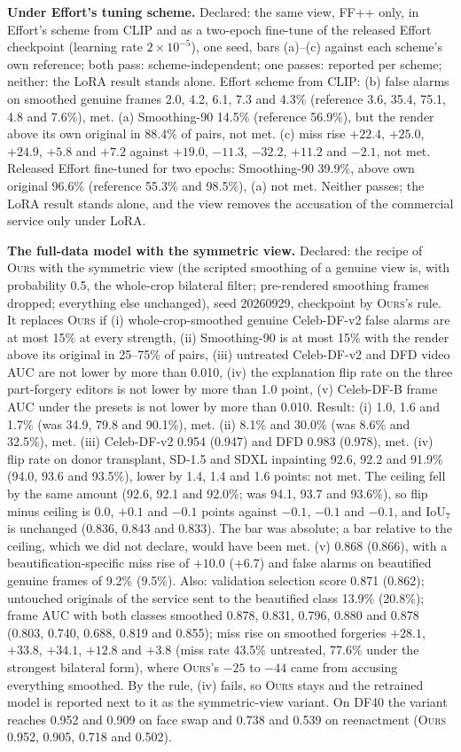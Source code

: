 \documentclass[10pt]{article}
\newcommand{\ours}{\textsc{Ours}}
\begin{document}
\textbf{Under Effort's tuning scheme.} Declared: the same view, FF++ only, in Effort's scheme from CLIP and as a two-epoch fine-tune
of the released Effort checkpoint (learning rate $2\times10^{-5}$), one seed, bars (a)--(c) against each scheme's own reference;
both pass: scheme-independent; one passes: reported per scheme; neither: the LoRA result stands alone. Effort scheme from CLIP: (b)
false alarms on smoothed genuine frames 2.0, 4.2, 6.1, 7.3 and 4.3\% (reference 3.6, 35.4, 75.1, 4.8 and 7.6\%), met. (a)
Smoothing-90 14.5\% (reference 56.9\%), but the render above its own original in 88.4\% of pairs, not met. (c) miss rise $+22.4$,
$+25.0$, $+24.9$, $+5.8$ and $+7.2$ against $+19.0$, $-11.3$, $-32.2$, $+11.2$ and $-2.1$, not met. Released Effort fine-tuned for two
epochs: Smoothing-90 39.9\%, above own original 96.6\% (reference 55.3\% and 98.5\%), (a) not met. Neither passes; the LoRA result
stands alone, and the view removes the accusation of the commercial service only under LoRA.

\textbf{The full-data model with the symmetric view.} Declared: the recipe of \ours{} with the symmetric view (the scripted smoothing
of a genuine view is, with probability 0.5, the whole-crop bilateral filter; pre-rendered smoothing frames dropped; everything else
unchanged), seed 20260929, checkpoint by \ours{}'s rule. It replaces \ours{} if (i) whole-crop-smoothed genuine Celeb-DF-v2 false
alarms are at most 15\% at every strength, (ii) Smoothing-90 is at most 15\% with the render above its original in 25--75\% of
pairs, (iii) untreated Celeb-DF-v2 and DFD video AUC are not lower by more than 0.010, (iv) the explanation flip rate on the three
part-forgery editors is not lower by more than 1.0 point, (v) Celeb-DF-B frame AUC under the presets is not lower by more than 0.010.
Result: (i) 1.0, 1.6 and 1.7\% (was 34.9, 79.8 and 90.1\%), met. (ii) 8.1\% and 30.0\% (was 8.6\% and 32.5\%), met. (iii)
Celeb-DF-v2 0.954 (0.947) and DFD 0.983 (0.978), met. (iv) flip rate on donor transplant, SD-1.5 and SDXL inpainting 92.6, 92.2 and
91.9\% (94.0, 93.6 and 93.5\%), lower by 1.4, 1.4 and 1.6 points: not met. The ceiling fell by the same amount (92.6, 92.1 and
92.0\%; was 94.1, 93.7 and 93.6\%), so flip minus ceiling is 0.0, $+0.1$ and $-0.1$ points against $-0.1$, $-0.1$ and $-0.1$, and
IoU$_7$ is unchanged (0.836, 0.843 and 0.833). The bar was absolute; a bar relative to the ceiling, which we did not declare, would
have been met. (v) 0.868 (0.866), with a beautification-specific miss rise of $+10.0$ ($+6.7$) and false alarms on beautified genuine
frames of 9.2\% (9.5\%). Also: validation selection score 0.871 (0.862); untouched originals of the service sent to the beautified
class 13.9\% (20.8\%); frame AUC with both classes smoothed 0.878, 0.831, 0.796, 0.880 and 0.878 (0.803, 0.740, 0.688, 0.819 and
0.855); miss rise on smoothed forgeries $+28.1$, $+33.8$, $+34.1$, $+12.8$ and $+3.8$ (miss rate 43.5\% untreated, 77.6\% under the
strongest bilateral form), where \ours{}'s $-25$ to $-44$ came from accusing everything smoothed. By the rule, (iv) fails, so \ours{}
stays and the retrained model is reported next to it as the symmetric-view variant. On DF40 the variant reaches 0.952 and 0.909 on
face swap and 0.738 and 0.539 on reenactment (\ours{} 0.952, 0.905, 0.718 and 0.502).
\end{document}
